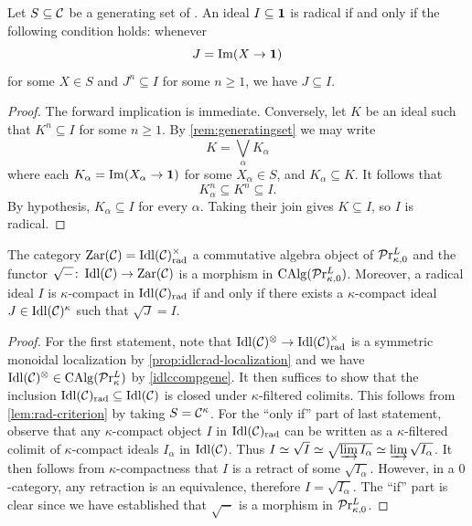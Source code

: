 \documentclass[10pt,a4paper,oneside]{article}
\begin{document}

\begin{lem}\label{lem:rad-criterion}
Let $S\subseteq \mathcal{C}$ be a generating set of \mcc. An ideal $I\subseteq\mathbf{1}$ is radical if and only if the following condition holds: whenever
\[
J = \operatorname{Im}(X\to\mathbf1)
\]
for some $X\in S$ and $J^n\subseteq I$ for some $n\geq 1$, we have $J\subseteq I$.
\end{lem}

\begin{proof}
The forward implication is immediate. Conversely, let $K$ be an ideal such that $K^n\subseteq I$ for some $n\geq1$. By \cref{rem:generatingset} we may write
\[
K = \bigvee_\alpha K_\alpha
\]
where each $K_\alpha = \operatorname{Im}(X_\alpha\to\mathbf1)$ for some $X_\alpha\in S$, and $K_\alpha\subseteq K$. It follows that
\[
K_\alpha^n\subseteq K^n\subseteq I.
\]
By hypothesis, $K_\alpha\subseteq I$ for every $\alpha$. Taking their join gives $K\subseteq I$, so $I$ is radical.
\end{proof}

\begin{prop}\label{radidprkl}
The category $\operatorname{Zar}(\mathcal C)=\operatorname{Idl}(\mathcal{C})_{\operatorname{rad}}^\times$ a commutative algebra object of $\mathcal{P}\mathrm{r}^L_{\kappa,0}$ and the functor $\sqrt{-} \colon \operatorname{Idl}(\mathcal{C}) \to \operatorname{Zar}(\mathcal{C})$ is a morphism in $ \operatorname{CAlg}(\mathcal{P}\mathrm{r}^L_{\kappa,0})$. Moreover, a radical ideal $I$ is $\kappa$-compact in $\operatorname{Idl}(\mathcal{C})_{\operatorname{rad}}$ if and only if there exists a $\kappa$-compact ideal $J\in \operatorname{Idl}(\mathcal{C})^\kappa$ such that $\sqrt{J}=I$.
\end{prop}

\begin{proof}
For the first statement, note that $\operatorname{Idl}(\mathcal{C})^{\otimes}\to \operatorname{Idl}(\mathcal{C})_{\operatorname{rad}}^\times$ is a symmetric monoidal localization by \cref{prop:idlcrad-localization} and we have $\operatorname{Idl}(\mathcal{C})^{\otimes} \in \operatorname{CAlg}(\mathcal{P}\mathrm{r}^L_{\kappa})$ by \cref{idlccompgene}. It then suffices to show that the inclusion $\operatorname{Idl}(\mathcal{C})_{\operatorname{rad}}\subseteq \operatorname{Idl}(\mathcal{C})$ is closed under $\kappa$-filtered colimits. This follows from \cref{lem:rad-criterion} by taking $S=\mathcal C^\kappa$. For the ``only if'' part of last statement, observe that any $\kappa$-compact object $I$ in $\operatorname{Idl}(\mathcal{C})_{\operatorname{rad}}$ can be written as a $\kappa$-filtered colimit of $\kappa$-compact ideals $I_\alpha$ in $\operatorname{Idl}(\mathcal{C})$. Thus $I \simeq \sqrt I \simeq \sqrt{\varinjlim I_\alpha} \simeq\varinjlim \sqrt{I_\alpha}$. It then follows from $\kappa$-compactness that $I$ is a retract of some $\sqrt{I_\alpha}$. However, in a $0$-category, any retraction is an equivalence, therefore $I=\sqrt{I_\alpha}$. The ``if'' part is clear since we have established that $\sqrt{-}$ is a morphism in $\mathcal{P}\mathrm{r}^L_{\kappa,0}$.
\end{proof}
\end{document}
